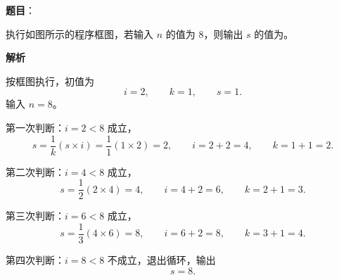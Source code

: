\begin{answer}

\textbf{题目}：

执行如图所示的程序框图，若输入 $n$ 的值为 $8$，则输出 $s$ 的值为\gkblank{}。
\nopagebreak[4]
\begin{center}\end{center}
\nopagebreak[4]
\textbf{解析}

按框图执行，初值为
\nopagebreak[4]
\[i=2,\qquad k=1,\qquad s=1.\]
输入 $n=8$。

第一次判断：$i=2<8$ 成立，
\nopagebreak[4]
\[s=\frac1k(s\times i)=\frac11(1\times2)=2,\qquad i=2+2=4,\qquad k=1+1=2.\]

第二次判断：$i=4<8$ 成立，
\nopagebreak[4]
\[s=\frac12(2\times4)=4,\qquad i=4+2=6,\qquad k=2+1=3.\]

第三次判断：$i=6<8$ 成立，
\nopagebreak[4]
\[s=\frac13(4\times6)=8,\qquad i=6+2=8,\qquad k=3+1=4.\]

第四次判断：$i=8<8$ 不成立，退出循环，输出
\nopagebreak[4]
\[s=8.\]


\end{answer}

